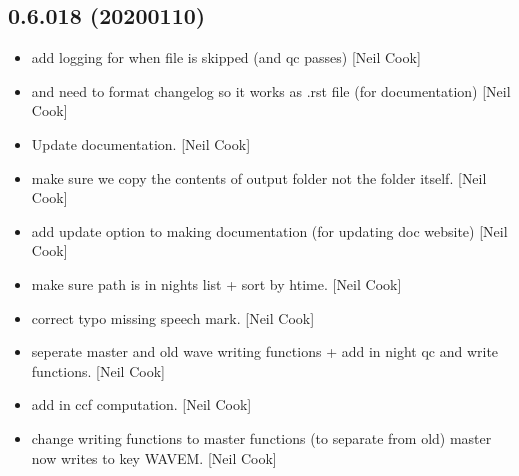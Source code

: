 \documentclass[a4paper,10pt,english]{report}
\begin{document}
\subsection{0.6.018 (2020\sphinxhyphen{}01\sphinxhyphen{}10)}
\label{\detokenize{misc/changelog:id19}}\begin{itemize}
\item {} 
 \sphinxhyphen{} add logging for when file
is skipped (and qc passes) {[}Neil Cook{]}

\item {} 
 and
 \sphinxhyphen{} need to format changelog so it
works as .rst file (for documentation) {[}Neil Cook{]}

\item {} 
Update documentation. {[}Neil Cook{]}

\item {} 
 \sphinxhyphen{} make sure we copy
the contents of output folder not the folder itself. {[}Neil Cook{]}

\item {} 
 \sphinxhyphen{} add update option to making
documentation (for updating doc website) {[}Neil Cook{]}

\item {} 
 \sphinxhyphen{} make sure path is in nights
list + sort by htime. {[}Neil Cook{]}

\item {} 
 \sphinxhyphen{} correct typo \textendash{} missing
speech mark. {[}Neil Cook{]}

\item {} 
 \sphinxhyphen{} seperate master and old wave writing functions
+ add in night qc and write functions. {[}Neil Cook{]}

\item {} 
 \sphinxhyphen{} add in ccf computation. {[}Neil Cook{]}

\item {} 
 \sphinxhyphen{} change writing functions to master
functions (to separate from  \textendash{} old) \sphinxhyphen{} master now writes to
key WAVEM. {[}Neil Cook{]}


\end{itemize}
\end{document}
